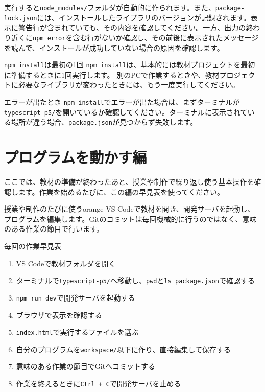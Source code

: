 実行すると\texttt{node\_modules/}フォルダが自動的に作られます。また、\texttt{package-lock.json}には、インストールしたライブラリのバージョンが記録されます。表示に警告行が含まれていても、その内容を確認してください。一方、出力の終わり近くに\texttt{npm error}を含む行がないか確認し、その前後に表示されたメッセージを読んで、インストールが成功していない場合の原因を確認します。

\begin{pointbox}{\texttt{npm install}は最初の1回}
\texttt{npm install}は、基本的には教材プロジェクトを最初に準備するときに1回実行します。
別のPCで作業するときや、教材プロジェクトに必要なライブラリが変わったときには、もう一度実行してください。
\end{pointbox}

\begin{notebox}{エラーが出たとき}
\texttt{npm install}でエラーが出た場合は、まずターミナルが\texttt{typescript-p5/}を開いているか確認してください。ターミナルに表示されている場所が違う場合、\texttt{package.json}が見つからず失敗します。
\end{notebox}

\section{プログラムを動かす編}
ここでは、教材の準備が終わったあと、授業や制作で繰り返し使う基本操作を確認します。作業を始めるたびに、この編の早見表を使ってください。

\begin{chapterphasebox}{授業や制作のたびに使う}{orange}
VS Codeで教材を開き、開発サーバを起動し、プログラムを編集します。Gitのコミットは毎回機械的に行うのではなく、意味のある作業の節目で行います。
\end{chapterphasebox}

\begin{pointbox}{毎回の作業早見表}
\begin{enumerate}
    \item VS Codeで教材フォルダを開く
    \item ターミナルで\texttt{typescript-p5/}へ移動し、\texttt{pwd}と\texttt{ls package.json}で確認する
    \item \texttt{npm run dev}で開発サーバを起動する
    \item ブラウザで表示を確認する
    \item \texttt{index.html}で実行するファイルを選ぶ
    \item 自分のプログラムを\texttt{workspace/}以下に作り、直接編集して保存する
    \item 意味のある作業の節目でGitへコミットする
    \item 作業を終えるときに\texttt{Ctrl + C}で開発サーバを止める
\end{enumerate}
\end{pointbox}

